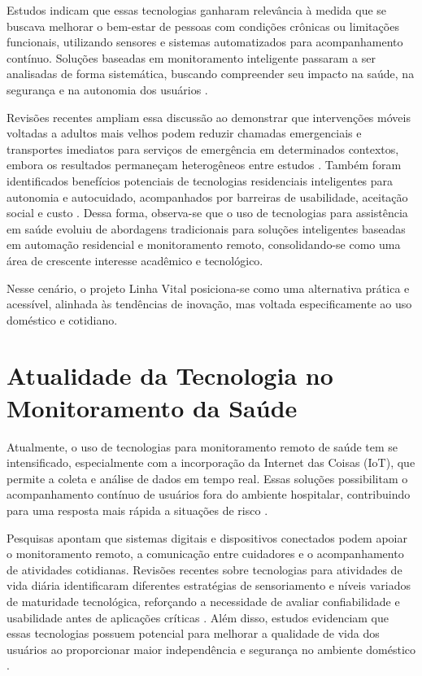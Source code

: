Estudos indicam que essas tecnologias ganharam relevância à medida que se buscava melhorar o bem-estar de pessoas com condições crônicas ou limitações funcionais, utilizando sensores e sistemas automatizados para acompanhamento contínuo. Soluções baseadas em monitoramento inteligente passaram a ser analisadas de forma sistemática, buscando compreender seu impacto na saúde, na segurança e na autonomia dos usuários \cite{ambientassistedliving2016}.

Revisões recentes ampliam essa discussão ao demonstrar que intervenções móveis voltadas a adultos mais velhos podem reduzir chamadas emergenciais e transportes imediatos para serviços de emergência em determinados contextos, embora os resultados permaneçam heterogêneos entre estudos \cite{louras2023}. Também foram identificados benefícios potenciais de tecnologias residenciais inteligentes para autonomia e autocuidado, acompanhados por barreiras de usabilidade, aceitação social e custo \cite{tian2024}. Dessa forma, observa-se que o uso de tecnologias para assistência em saúde evoluiu de abordagens tradicionais para soluções inteligentes baseadas em automação residencial e monitoramento remoto, consolidando-se como uma área de crescente interesse acadêmico e tecnológico.

Nesse cenário, o projeto Linha Vital posiciona-se como uma alternativa prática e acessível, alinhada às tendências de inovação, mas voltada especificamente ao uso doméstico e cotidiano.

\section{Atualidade da Tecnologia no Monitoramento da Saúde}

Atualmente, o uso de tecnologias para monitoramento remoto de saúde tem se intensificado, especialmente com a incorporação da Internet das Coisas (IoT), que permite a coleta e análise de dados em tempo real. Essas soluções possibilitam o acompanhamento contínuo de usuários fora do ambiente hospitalar, contribuindo para uma resposta mais rápida a situações de risco \cite{iothealthcare2020,predictivehealthcare2020}.

Pesquisas apontam que sistemas digitais e dispositivos conectados podem apoiar o monitoramento remoto, a comunicação entre cuidadores e o acompanhamento de atividades cotidianas. Revisões recentes sobre tecnologias para atividades de vida diária identificaram diferentes estratégias de sensoriamento e níveis variados de maturidade tecnológica, reforçando a necessidade de avaliar confiabilidade e usabilidade antes de aplicações críticas \cite{gadey2024}. Além disso, estudos evidenciam que essas tecnologias possuem potencial para melhorar a qualidade de vida dos usuários ao proporcionar maior independência e segurança no ambiente doméstico \cite{smarthomehealth2019}.

